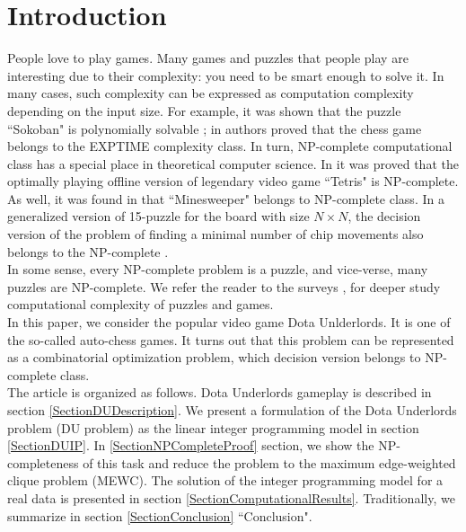 \documentclass[smallextended]{svjour3}       %
\begin{document}
\section{Introduction}
People love to play games. Many games and puzzles that people play are interesting due to their complexity: you need to be smart enough to solve it. In many cases, such complexity can be expressed as computation complexity depending on the input size. For example, it was shown that the puzzle ``Sokoban" is polynomially solvable \cite{hearn2005pspace}; in \cite{fraenkel1981computing} authors proved that the chess game belongs to the EXPTIME complexity class.
In turn, NP-complete computational class has a special place in theoretical computer science.
In \cite{breukelaar2004tetris} it was proved that the optimally playing offline version of legendary video game ``Tetris" is NP-complete. As well, it was found in \cite{kaye2000minesweeper} that ``Minesweeper" belongs to NP-complete class. In a generalized version of 15-puzzle for the board with size $N \times N$, the decision version of the problem of finding a minimal number of chip movements also belongs to the NP-complete \cite{ratner1986finding}.\\
In some sense, every NP-complete problem is a puzzle, and vice-verse, many puzzles are NP-complete. We refer the reader to the surveys \cite{costa2018computational}, \cite{kendall2008survey} for deeper study computational complexity of puzzles and games.\\
In this paper, we consider the popular video game Dota Unlderlords. It is one of the so-called auto-chess games. It turns out that this problem can be represented as a combinatorial optimization problem, which decision version belongs to NP-complete class.\\
The article is organized as follows. Dota Underlords gameplay is described in section \ref{SectionDUDescription}.
We present a formulation of the Dota Underlords problem (DU problem) as the linear integer programming model in section \ref{SectionDUIP}. In \ref{SectionNPCompleteProof} section, we show the NP-completeness of this task and reduce the problem to the maximum edge-weighted clique problem (MEWC). The solution of the integer programming model for a real data is presented in section \ref{SectionComputationalResults}. Traditionally, we summarize in section \ref{SectionConclusion} ``Conclusion".
\end{document}
